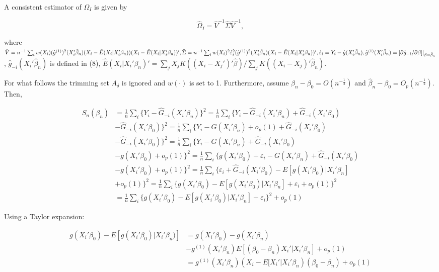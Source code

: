 \documentclass[a4paper]{article}
\begin{document}
A consistent estimator of $\Omega_I$ is given by

\[ \hat{\Omega}_I = \hat{V}^{-1}\hat{\Sigma}\hat{V}^{-1}, \]

where $\hat{V} = n^{-1}\sum_{i} w(X_i)(\hat{g}^{(1)})^2(X_i'\hat{\beta}_n)(X_i - \hat{E}(X_i|X_i'\beta_n))(X_i - \hat{E}(X_i|X_i'\beta_n))', \hat{\Sigma} = n^{-1}\sum_{i} w(X_i)^2\hat{\varepsilon}_{i}^{2}(\hat{g}^{(1)})^2(X_i'\hat{\beta}_n)(X_i - \hat{E}(X_i|X_i'\beta_n))', \hat{\varepsilon}_i = Y_i - \hat{g}(X_i'\hat{\beta}_n), \hat{g}^{(1)}(X_i'\hat{\beta}_n) \linebreak
= [\partial \hat{g}_{-i}/\partial \beta]|_{\beta=\hat{\beta}_n}$, $\hat{g}_{-i}(X_i'\hat{\beta}_n)$ is defined in (8), $\hat{E}(X_i|X_i'\beta_n)' = \sum_{j} X_jK((X_i - X_j')'\hat{\beta})/ \sum_{j}K((X_i - X_j)'\hat{\beta}_n).$

For what follows the trimming set $A_\delta$ is ignored and $w(\cdot)$ is set to 1. Furthermore, assume $\beta_n - \beta_0 = O(n^{-\frac{1}{2}})$ and $\hat{\beta}_n - \beta_0 = O_p(n^{-\frac{1}{2}})$. Then, 


\begin{align*}
S_{n}(\beta_n) & = \frac{1}{n}\sum_i \{ Y_i - \hat{G}_{-i}(X_i'\beta_n)\}^2 = \frac{1}{n}\sum_i\{Y_i - \hat{G}_{-i}(X_i'\beta_n) +  \hat{G}_{-i}(X_i'\beta_0) \\
			 & - \hat{G}_{-i}(X_i'\beta_0) \}^2 = \frac{1}{n} \sum_i \{Y_i - G(X_i'\beta_n) + o_p(1) + \hat{G}_{-i}(X_i'\beta_0) \\
			 & - \hat{G}_{-i}(X_i'\beta_0) \}^2 = \frac{1}{n}\sum_i \{ Y_i - G(X_i'\beta_n) + \hat{G}_{-i}(X_i'\beta_0) \\
			 & - g(X_i'\beta_0) + o_p(1) \}^2 = \frac{1}{n} \sum_i \{ g(X_i'\beta_0) + \varepsilon_i - G(X_i'\beta_n) + \hat{G}_{-i}(X_i'\beta_0) \\
			 & - g(X_i'\beta_0) + o_p(1) \}^2 = \frac{1}{n} \sum_i \{ \varepsilon_i + \hat{G}_{-i}(X_i'\beta_0) - E[g(X_i'\beta_0)|X_i'\beta_n] \\
			 & + o_p(1) \}^2 = \frac{1}{n}\sum_i \{ g(X_i'\beta_0) - E[g(X_i'\beta_0)|X_i'\beta_n] +  \varepsilon_i + o_p(1)\}^2 \\
			 & = \frac{1}{n}\sum_i \{ g(X_i'\beta_0) - E[g(X_i'\beta_0)|X_i'\beta_n] +  \varepsilon_i\}^2 + o_p(1)
\end{align*}

Using a Taylor expansion:

\begin{align*}
g(X_i'\beta_0) - E[g(X_i'\beta_0)|X_i'\beta_n)] & = g(X_i'\beta_0) - g(X_i'\beta_n) \\
											 & - g^{(1)}(X_i'\beta_n)E[(\beta_0 - \beta_n)X_i'|X_i'\beta_n] + o_p(1) \\
				                              & = g^{(1)}(X_i'\beta_n)( X_i - E[X_i'|X_i'\beta_n)(\beta_0 - \beta_n) + o_p(1)
\end{align*}
\end{document}
